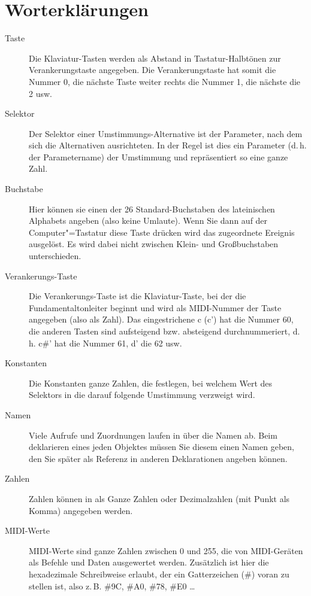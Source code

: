 \section{Worterklärungen}\label{sec:worterklarungen}
\begin{description}
\item[Taste] Die Klaviatur-Tasten werden als Abstand in
  Tastatur-Halbtönen zur Verankerungstaste angegeben. Die
  Verankerungstaste hat somit die Nummer 0, die nächste Taste weiter
  rechts die Nummer 1, die nächste die 2 usw.

\item[Selektor] Der Selektor einer Umstimmungs-Alternative ist der
  Parameter, nach dem sich die Alternativen ausrichteten. In der Regel
  ist dies ein Parameter (d.\,h. der Parametername) der Umstimmung und
  repräsentiert so eine ganze Zahl.

\item[Buchstabe] Hier können sie einen der 26 Standard-Buchstaben des
  lateinischen Alphabets angeben (also keine Umlaute). Wenn Sie dann
  auf der Computer"=Tastatur diese Taste drücken wird das zugeordnete
  Ereignis ausgelöst. Es wird dabei nicht zwischen Klein- und
  Großbuchstaben unterschieden.

\item[Verankerungs-Taste] Die Verankerungs-Taste ist die
  Klaviatur-Taste, bei der die Fundamentaltonleiter beginnt und wird
  als MIDI-Nummer der Taste angegeben (also als Zahl). Das
  eingestrichene c (c') hat die Nummer 60, die anderen Tasten sind
  aufsteigend bzw. absteigend durchnummeriert, d.\,h.  c\#' hat die
  Nummer 61, d' die 62 usw.

\item[Konstanten] Die Konstanten ganze Zahlen, die festlegen, bei
  welchem Wert des Selektors in die
  darauf folgende Umstimmung verzweigt wird.

\item[Namen] Viele Aufrufe und Zuordnungen laufen in \mutabor{}
  über die Namen ab. Beim deklarieren eines jeden Objektes müssen Sie
  diesem einen Namen geben, den Sie später als Referenz in anderen
  Deklarationen angeben können.

\item[Zahlen] Zahlen können in \mutabor{} als Ganze Zahlen oder
  Dezimalzahlen (mit Punkt als Komma) angegeben werden.

\item[MIDI-Werte] MIDI-Werte sind ganze Zahlen zwischen 0 und 255, die
  von MIDI-Geräten als Befehle und Daten ausgewertet werden.
  Zusätzlich ist hier die hexadezimale Schreibweise erlaubt, der ein
  Gatterzeichen (\#) voran zu stellen ist, also z.\,B. \#9C, \#A0, \#78,
  \#E0 \dots
\end{description}

